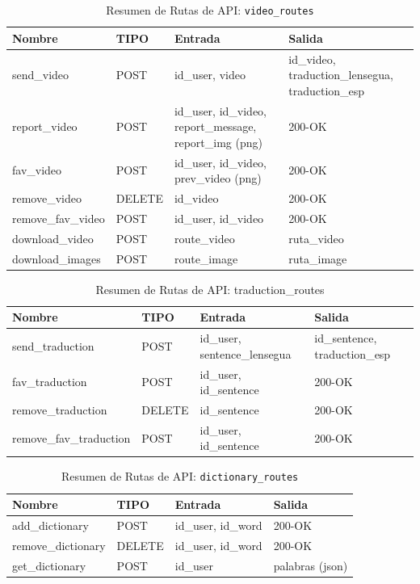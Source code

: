 \renewcommand{\arraystretch}{1.3} %
\begin{table}[H]
\centering
\begin{tabularx}{\textwidth}{|l|l|X|X|}
\hline
\textbf{Nombre} & \textbf{TIPO} & \textbf{Entrada} & \textbf{Salida} \\ \hline
send\_video & POST & id\_user, video & id\_video, traduction\_lensegua, traduction\_esp \\ \hline
report\_video & POST & id\_user, id\_video, report\_message, report\_img (png) & 200-OK \\ \hline
fav\_video & POST & id\_user, id\_video, prev\_video (png) & 200-OK \\ \hline
remove\_video & DELETE & id\_video & 200-OK \\ \hline
remove\_fav\_video & POST & id\_user, id\_video & 200-OK \\ \hline
download\_video & POST & route\_video & ruta\_video \\ \hline
download\_images & POST & route\_image & ruta\_image \\ \hline
\end{tabularx}
\caption{Resumen de Rutas de API: \texttt{video\_routes}}
\label{tab:video_routes}
\end{table}

\begin{table}[H]
\centering
\begin{tabularx}{\textwidth}{|l|l|l|X|}
\hline
\rowcolor{blue!30} \textbf{Nombre} & \textbf{TIPO} & \textbf{Entrada} & \textbf{Salida} \\ \hline
send\_traduction & POST & id\_user, sentence\_lensegua & id\_sentence, traduction\_esp \\ \hline
fav\_traduction & POST & id\_user, id\_sentence & 200-OK \\ \hline
remove\_traduction & DELETE & id\_sentence & 200-OK \\ \hline
remove\_fav\_traduction & POST & id\_user, id\_sentence & 200-OK \\ \hline
\end{tabularx}
\caption{Resumen de Rutas de API: traduction\_routes}
\label{tab:traduction_routes}
\end{table}

\begin{table}[H]
\centering
\begin{tabularx}{\textwidth}{|l|l|l|X|}
\hline
\textbf{Nombre} & \textbf{TIPO} & \textbf{Entrada} & \textbf{Salida} \\ \hline
add\_dictionary & POST & id\_user, id\_word & 200-OK \\ \hline
remove\_dictionary & DELETE & id\_user, id\_word & 200-OK \\ \hline
get\_dictionary & POST & id\_user & palabras (json) \\ \hline
\end{tabularx}
\caption{Resumen de Rutas de API: \texttt{dictionary\_routes}}
\label{tab:dictionary_routes}
\end{table}

